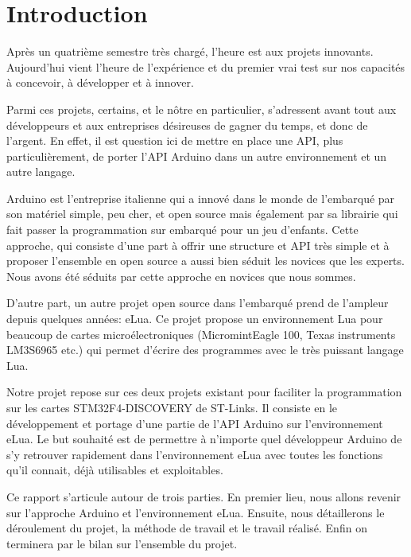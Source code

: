 \chapter*{Introduction} \label{chap:intro}

Après un quatrième semestre très chargé, l’heure est aux projets innovants. Aujourd'hui vient l'heure de l'expérience et du premier vrai test 
sur nos capacités à concevoir, à développer et à innover.

Parmi ces projets, certains, et le nôtre en particulier, s’adressent avant tout aux développeurs et aux entreprises désireuses de gagner du temps, 
et donc de l’argent. En effet, il est question ici de mettre en place une API, plus particulièrement, de porter l’API Arduino dans un autre environnement
et un autre langage.

Arduino est l’entreprise italienne qui a innové dans le monde de l’embarqué par son matériel simple, peu cher, et open source mais également par sa
 librairie qui fait passer la programmation sur embarqué pour un jeu d’enfants. Cette approche, qui consiste d’une part à offrir une structure et API 
très simple et à proposer l’ensemble en open source a aussi bien séduit les novices que les experts. Nous avons été séduits par cette approche en novices 
que nous sommes.

D'autre part, un autre projet open source dans l’embarqué prend de l’ampleur depuis quelques années: eLua. Ce projet propose un environnement Lua 
pour beaucoup de cartes microélectroniques (MicromintEagle 100, Texas instruments LM3S6965 etc.) qui permet d’écrire des programmes avec le très 
puissant langage Lua.

Notre projet repose sur ces deux projets existant pour faciliter la programmation sur les cartes STM32F4-DISCOVERY de ST-Links. Il consiste en 
le développement et portage d’une partie de l’API Arduino sur l’environnement eLua. Le but souhaité est de permettre à n’importe quel développeur
Arduino de s’y retrouver rapidement dans l’environnement eLua avec toutes les fonctions qu’il connait, déjà utilisables et exploitables.

\newpage
Ce rapport s’articule autour de trois parties. En premier lieu,  nous allons revenir sur l’approche Arduino et l’environnement eLua. 
Ensuite, nous détaillerons le déroulement du projet, la méthode de travail et le travail réalisé. Enfin on terminera par le bilan sur 
l’ensemble du projet.